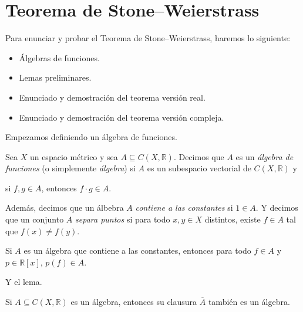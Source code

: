 \section{Teorema de Stone--Weierstrass}

Para enunciar y probar el Teorema de Stone--Weierstrass, haremos lo siguiente:
\begin{itemize}
	\item Álgebras de funciones.
	\item Lemas preliminares.
	\item Enunciado y demostración del teorema versión real.
	\item Enunciado y demostración del teorema versión compleja.
\end{itemize}

Empezamos definiendo un álgebra de funciones.

\begin{definition}
	Sea $X$ un espacio métrico y sea $A \subseteq C(X, \mathbb{R})$. Decimos que $A$ es un \emph{álgebra de funciones} (o simplemente \emph{álgebra}) si $A$ es un subespacio vectorial de $C(X, \mathbb{R})$ y
	\begin{center}
		si $f, g \in A$, entonces $f \cdot g \in A$.
	\end{center}

	Además, decimos que un álbebra $A$ \emph{contiene a las constantes} si $1 \in A$. Y decimos que un conjunto $A$ \emph{separa puntos} si para todo $x, y \in X$ distintos, existe $f \in A$ tal que $f(x) \neq f(y)$.
\end{definition}

\begin{remark}
	Si $A$ es un álgebra que contiene a las constantes, entonces para todo $f \in A$ y $p \in \mathbb{R}[x]$, $p(f) \in A$.
\end{remark}

Y el lema.

\begin{lemma}
	Si $A \subseteq C(X, \mathbb{R})$ es un álgebra, entonces su clausura $\overline{A}$ también es un álgebra.
\end{lemma}

